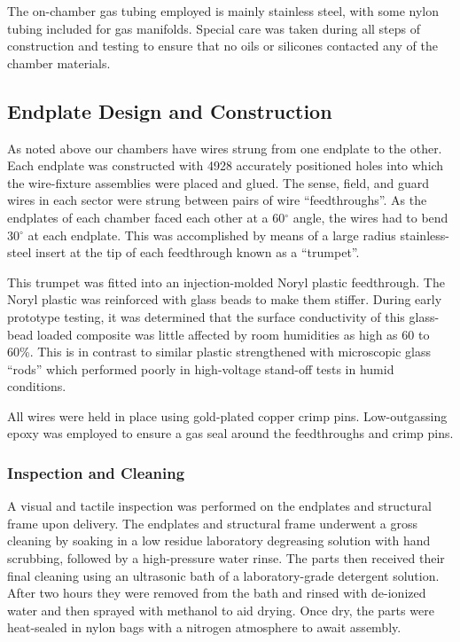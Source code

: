 The on-chamber gas tubing employed is mainly stainless steel, with some
nylon tubing included for gas manifolds.  Special care was taken during
all steps of construction and testing to ensure that no oils or
silicones contacted any of the chamber materials.



\subsection{Endplate Design and Construction}

As noted above our chambers have wires strung from one endplate to 
the other. 
Each endplate was constructed with 4928 accurately positioned holes into 
which the wire-fixture assemblies were placed and glued.  The sense, field, 
and guard wires in each 
sector were strung between pairs of wire ``feedthroughs''.  As the endplates of 
each chamber faced each other at a 60$^{\circ}$ angle, the wires had to bend 
30$^{\circ}$ at each endplate.  This was accomplished by means of a large radius 
stainless-steel insert at the tip of each feedthrough known as a ``trumpet''.

This trumpet was fitted into an injection-molded Noryl plastic feedthrough.  
The Noryl plastic was reinforced with glass beads to make them stiffer.
During early prototype testing, it was determined that the surface conductivity
of this glass-bead loaded composite was little affected by room humidities
as high as 60 to 60\%.  This is in contrast to similar plastic strengthened
with microscopic glass ``rods'' which performed poorly in high-voltage stand-off
tests in humid conditions.

All wires were held in place using gold-plated copper crimp pins.  
Low-outgassing epoxy was employed to ensure a gas seal around the feedthroughs 
and crimp pins.  

\subsubsection{Inspection and Cleaning}

A visual and tactile inspection was performed on the endplates and 
structural frame upon delivery.  The endplates and structural 
frame underwent a gross cleaning by soaking in a low residue laboratory 
degreasing solution with hand scrubbing, followed by a high-pressure water 
rinse. The parts then received their final cleaning using an ultrasonic 
bath of a laboratory-grade detergent solution.  After two hours they were
removed from the bath and rinsed with de-ionized water and then sprayed 
with methanol to aid drying. Once dry, the parts were heat-sealed in nylon 
bags with a nitrogen atmosphere to await assembly.

